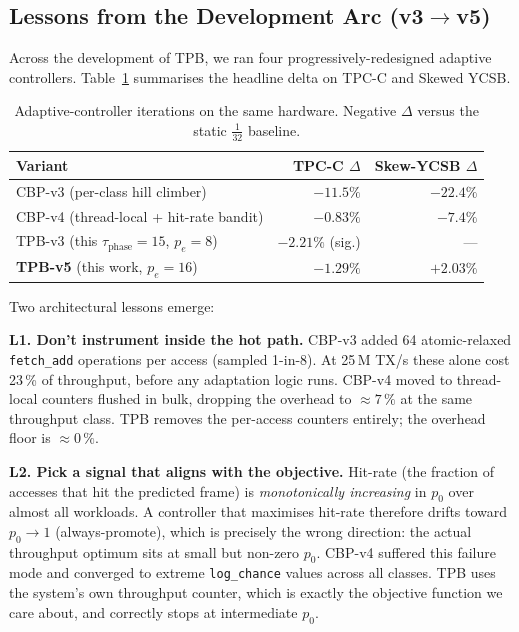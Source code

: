 \documentclass[10pt,twocolumn]{article}
\begin{document}
\subsection{Lessons from the Development Arc (v3$\to$v5)}

Across the development of TPB, we ran four progressively-redesigned
adaptive controllers.  Table~\ref{tab:journey} summarises the headline
delta on TPC-C and Skewed YCSB.

\begin{table}[h]
\centering\small
\caption{Adaptive-controller iterations on the same hardware.  Negative
  $\Delta$ versus the static $\tfrac{1}{32}$ baseline.}
\label{tab:journey}
\begin{tabular}{l rr}
\toprule
Variant & TPC-C $\Delta$ & Skew-YCSB $\Delta$ \\
\midrule
CBP-v3 (per-class hill climber)               & $-11.5\%$ & $-22.4\%$ \\
CBP-v4 (thread-local + hit-rate bandit)       & $-0.83\%$ & $-7.4\%$  \\
TPB-v3 (this $\tau_{\text{phase}}\!=\!15$, $p_e\!=\!8$) & $-2.21\%$ (sig.) & --- \\
\textbf{TPB-v5} (this work, $p_e\!=\!16$)     & $-1.29\%$ & $+2.03\%$ \\
\bottomrule
\end{tabular}
\end{table}

Two architectural lessons emerge:

\textbf{L1.  Don't instrument inside the hot path.}  CBP-v3 added 64
atomic-relaxed \texttt{fetch\_add} operations per access (sampled
1-in-8).  At 25\,M TX/s these alone cost 23\,\% of throughput, before
any adaptation logic runs.  CBP-v4 moved to thread-local counters
flushed in bulk, dropping the overhead to $\approx 7\,\%$ at the same
throughput class.  TPB removes the per-access counters entirely; the
overhead floor is $\approx 0\,\%$.

\textbf{L2.  Pick a signal that aligns with the objective.}
Hit-rate (the fraction of accesses that hit the predicted frame) is
\emph{monotonically increasing} in $p_0$ over almost all workloads.  A
controller that maximises hit-rate therefore drifts toward
$p_0 \to 1$ (always-promote), which is precisely the wrong direction:
the actual throughput optimum sits at small but non-zero $p_0$.  CBP-v4
suffered this failure mode and converged to extreme \texttt{log\_chance}
values across all classes.  TPB uses the system's own throughput
counter, which is exactly the objective function we care about, and
correctly stops at intermediate $p_0$.
\end{document}
